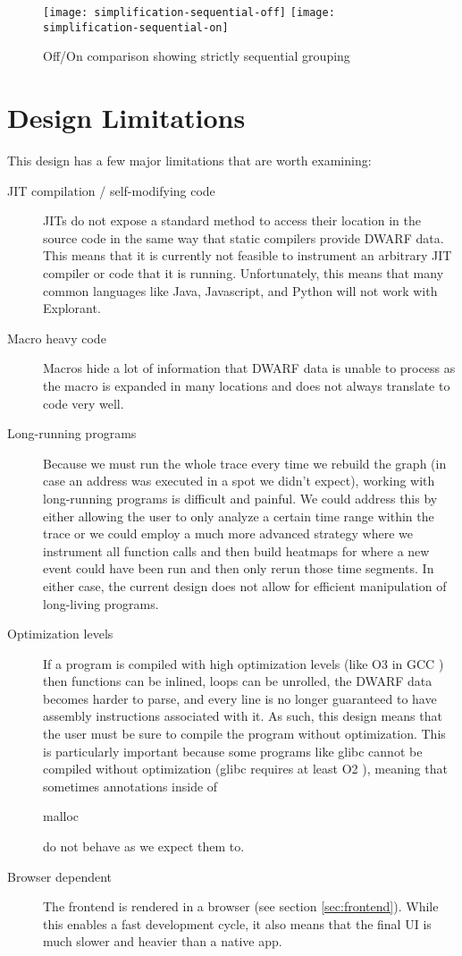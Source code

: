 \begin{figure}[!ht]
\centering
\texttt{[image: simplification-sequential-off]}
\texttt{[image: simplification-sequential-on]}
\caption{Off/On comparison showing strictly sequential grouping}
    \label{fig:seq-on-off}
\end{figure}


\section{Design Limitations}
\label{sec:design-limitations}

\noindent This design has a few major limitations that are worth examining:

\begin{description}
    \item[JIT compilation / self-modifying code] JITs \cite{jit} do not expose a standard method to access their location in the source code in the same way that static compilers provide DWARF data. This means that it is currently not feasible to instrument an arbitrary JIT compiler or code that it is running. Unfortunately, this means that many common languages like Java, Javascript, and Python will not work with Explorant.
\item[Macro heavy code] Macros hide a lot of information that DWARF data is unable to process as the macro is expanded in many locations and does not always translate to code very well. 
\item[Long-running programs] Because we must run the whole trace every time we rebuild the graph (in case an address was executed in a spot we didn't expect), working with long-running programs is difficult and painful. We could address this by either allowing the user to only analyze a certain time range within the trace or we could employ a much more advanced strategy where we instrument all function calls and then build heatmaps for where a new event could have been run and then only rerun those time segments. In either case, the current design does not allow for efficient manipulation of long-living programs. 
\item[Optimization levels] If a program is compiled with high optimization levels (like O3 in GCC \cite{gcc}) then functions can be inlined, loops can be unrolled, the DWARF data becomes harder to parse, and every line is no longer guaranteed to have assembly instructions associated with it. As such, this design means that the user must be sure to compile the program without optimization. This is particularly important because some programs like glibc cannot be compiled without optimization (glibc requires at least O2 \cite{glibco2}), meaning that sometimes annotations inside of \begin{tt}malloc\end{tt} do not behave as we expect them to. 
    \item[Browser dependent] The frontend is rendered in a browser (see section \ref{sec:frontend}). While this enables a fast development cycle, it also means that the final UI is much slower and heavier than a native app. 
\end{description}
